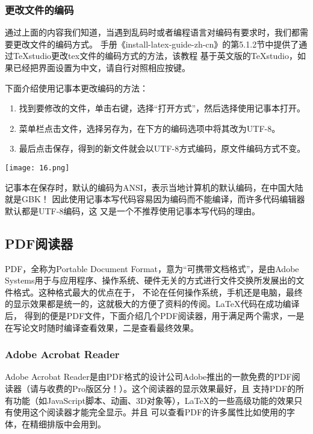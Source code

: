 \subsubsection{更改文件的编码}


通过上面的内容我们知道，当遇到乱码时或者编程语言对编码有要求时，我们都需要更改文件的编码方式。
手册《install-latex-guide-zh-cn》的第5.1.2节中提供了通过TeXstudio更改tex文件的编码方式的方法，该教程
基于英文版的TeXstudio，如果已经把界面设置为中文，请自行对照相应按键。

下面介绍使用记事本更改编码的方法：
\begin{enumerate}
  \item 找到要修改的文件，单击右键，选择“打开方式”，然后选择使用记事本打开。
  \item 菜单栏点击文件，选择另存为，在下方的编码选项中将其改为UTF-8。
  \item 最后点击保存，得到的新文件就会以UTF-8方式编码，原文件编码方式不变。
\end{enumerate}
\begin{center}
  \texttt{[image: 16.png]}
\end{center}

记事本在保存时，默认的编码为ANSI，表示当地计算机的默认编码，在中国大陆就是GBK！
因此使用记事本写代码容易因为编码而不能编译，而许多代码编辑器默认都是UTF-8编码，这
又是一个不推荐使用记事本写代码的理由。


\subsection{PDF阅读器}


PDF，全称为Portable Document Format，意为“可携带文档格式”，是由Adobe Systems用于与应用程序、操作系统、硬件无关的方式进行文件交换所发展出的文件格式。这种格式最大的优点在于，
不论在任何操作系统，手机还是电脑，最终的显示效果都是统一的，这就极大的方便了资料的传阅。\LaTeX{}代码在成功编译后，
得到的便是PDF文件，下面介绍几个PDF阅读器，用于满足两个需求，一是在写论文时随时编译查看效果，二是查看最终效果。



\subsubsection{Adobe Acrobat Reader}


Adobe Acrobat Reader是由PDF格式的设计公司Adobe推出的一款免费的PDF阅读器（请与收费的Pro版区分！）。这个阅读器的显示效果最好，且
支持PDF的所有功能（如JavaScript脚本、动画、3D对象等），\LaTeX{}的一些高级功能的效果只有使用这个阅读器才能完全显示。并且
可以查看PDF的许多属性比如使用的字体，在精细排版中会用到。

